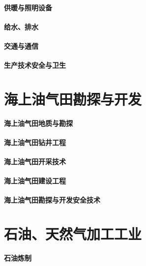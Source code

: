 \documentclass[UTF8]{../../ApplicationUniverse}
\begin{document}
\subsubsection{供暖与照明设备}
\subsubsection{给水、排水}
\subsubsection{交通与通信}
\subsubsection{生产技术安全与卫生}







\chapter{海上油气田勘探与开发}
\subsubsection{海上油气田地质与勘探}
\subsubsection{海上油气田钻井工程}
\subsubsection{海上油气田开采技术}
\subsubsection{海上油气田建设工程}
\subsubsection{海上油气田勘探与开发安全技术}






\chapter{石油、天然气加工工业}
\subsubsection{石油炼制}
\end{document}

